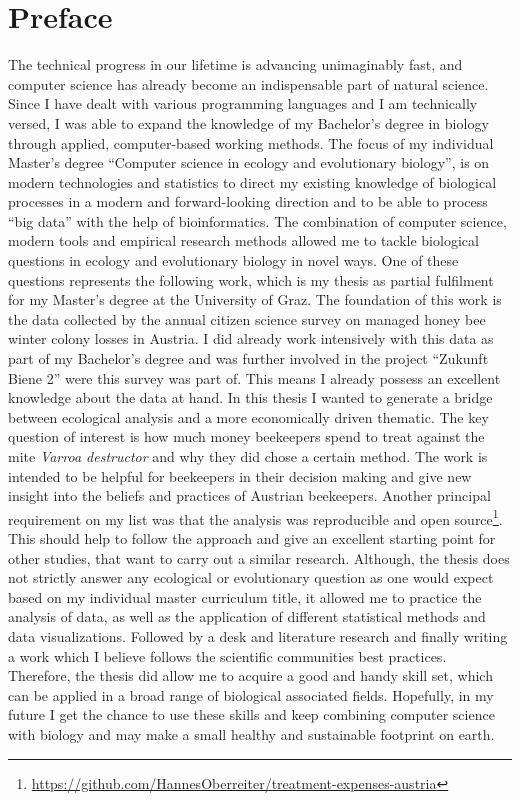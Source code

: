 \chapter*{Preface}
\label{sec:Preface}
\vspace*{-10mm}

The technical progress in our lifetime is advancing unimaginably fast, and computer science has already become an indispensable part of natural science. Since I have dealt with various programming languages and I am technically versed, I was able to expand the knowledge of my Bachelor's degree in biology through applied, computer-based working methods. The focus of my individual Master's degree \enquote{Computer science in ecology and evolutionary biology}, is on modern technologies and statistics to direct my existing knowledge of biological processes in a modern and forward-looking direction and to be able to process \enquote{big data} with the help of bioinformatics. The combination of computer science, modern tools and empirical research methods allowed me to tackle biological questions in ecology and evolutionary biology in novel ways. One of these questions represents the following work, which is my thesis as partial fulfilment for my Master's degree at the University of Graz. The foundation of this work is the data collected by the annual citizen science survey on managed honey bee winter colony losses in Austria. I did already work intensively with this data as part of my Bachelor's degree and was further involved in the project \enquote{Zukunft Biene 2} were this survey was part of. This means I already possess an excellent knowledge about the data at hand. In this thesis I wanted to generate a bridge between ecological analysis and a more economically driven thematic. The key question of interest is how much money beekeepers spend to treat against the mite \textit{Varroa destructor} and why they did chose a certain method. The work is intended to be helpful for beekeepers in their decision making and give new insight into the beliefs and practices of Austrian beekeepers. Another principal requirement on my list was that the analysis was reproducible and open source\footnote{\url{https://github.com/HannesOberreiter/treatment-expenses-austria}}. This should help to follow the approach and give an excellent starting point for other studies, that want to carry out a similar research. Although, the thesis does not strictly answer any ecological or evolutionary question as one would expect based on my individual master curriculum title, it allowed me to practice the analysis of data, as well as the application of different statistical methods and data visualizations. Followed by a desk and literature research and finally writing a work which I believe follows the scientific communities best practices. Therefore, the thesis did allow me to acquire a good and handy skill set, which can be applied in a broad range of biological associated fields. Hopefully, in my future I get the chance to use these skills and keep combining computer science with biology and may make a small healthy and sustainable footprint on earth.